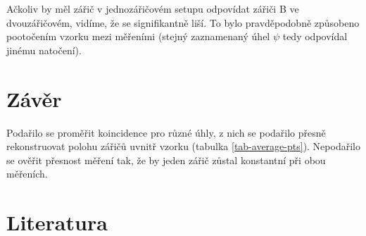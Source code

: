 \documentclass[10pt,a4paper]{article}
\newcommand{\°}{\degree}
\begin{document}
Ačkoliv by měl zářič v jednozářičovém setupu odpovídat zářiči B ve dvouzářičovém, vidíme, že se signifikantně liší. To bylo pravděpodobně způsobeno pootočením vzorku mezi měřeními (stejný zaznamenaný úhel $\psi$ tedy odpovídal jinému natočení).


\section{Závěr}
Podařilo se proměřit koincidence pro různé úhly, z nich se podařilo přesně rekonstruovat polohu zářičů uvnitř vzorku (tabulka \ref{tab-average-pts}). Nepodařilo se ověřit přesnost měření tak, že by jeden zářič zůstal konstantní při obou měřeních.

\section{Literatura}
 


 
\end{document}
